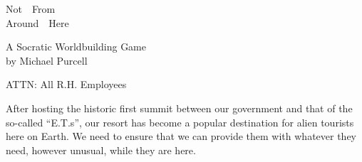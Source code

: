 \documentclass[a6paper, 11pt, parskip=half, DIV=15]{scrartcl}
\begin{document}
\begin{titlepage}
\enlargethispage{3.0\baselineskip}
\setmainfont[Scale=1.55]{Dakota Rough}
\Huge
\begin{center}
\vspace*{-0.5\baselineskip}
Not\ \ From\\[1ex]
Around\ \ Here

\vfill
{}
\vfill
\huge
\setmainfont{Caveat}
A Socratic Worldbuilding Game\\
by Michael Purcell
\end{center}
\end{titlepage}
\thispagestyle{empty}
\enlargethispage{1.75\baselineskip}
\setmainfont{Special Elite}
\normalsize
\noindent ATTN: All R.H. Employees


After hosting the historic first summit between our government and that of the so-called ``E.T.s'', our resort has become a popular destination for alien tourists here on Earth. We need to ensure that we can provide them with whatever they need, however unusual, while they are here.
\end{document}
